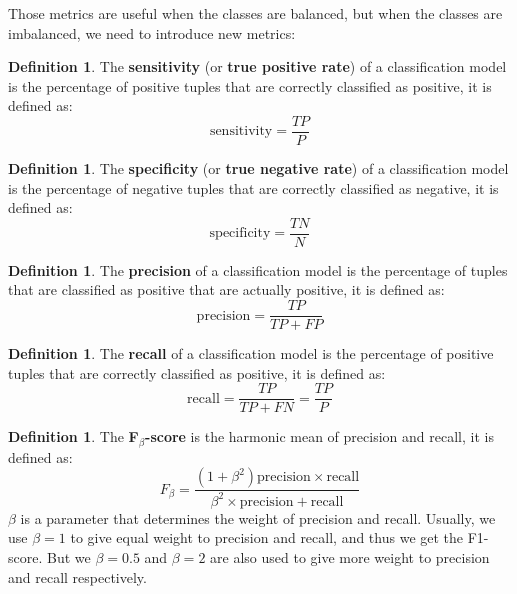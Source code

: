 \documentclass[12pt, openany]{report}
\theoremstyle{definition}
\newtheorem{definition}[thm]{Definition}
\begin{document}
Those metrics are useful when the classes are balanced, but when the classes are imbalanced, we need to introduce new metrics:
\begin{definition}
    The \textbf{sensitivity} (or \textbf{true positive rate}) of a classification model is the percentage of positive tuples that are correctly classified as positive, it is defined as:
    \begin{equation}
        \text{sensitivity} = \frac{TP}{P}
    \end{equation}
\end{definition}
\begin{definition}
    The \textbf{specificity} (or \textbf{true negative rate}) of a classification model is the percentage of negative tuples that are correctly classified as negative, it is defined as:
    \begin{equation}
        \text{specificity} = \frac{TN}{N}
    \end{equation}
\end{definition}
\begin{definition}
    The \textbf{precision} of a classification model is the percentage of tuples that are classified as positive that are actually positive, it is defined as:
    \begin{equation}        
        \text{precision} = \frac{TP}{TP + FP}
    \end{equation}
\end{definition}
\begin{definition}
    The \textbf{recall} of a classification model is the percentage of positive tuples that are correctly classified as positive, it is defined as:
    \begin{equation}
        \text{recall} = \frac{TP}{TP + FN} = \frac{TP}{P}
    \end{equation}
\end{definition}
\begin{definition}
    The \textbf{F$_{\beta}$-score} is the harmonic mean of precision and recall, it is defined as:
    \begin{equation}
    F_{\beta} =  \frac{(1 + \beta^2) \text{precision} \times \text{recall}}{\beta^2 \times \text{precision} + \text{recall}}
    \end{equation}
    $\beta$ is a parameter that determines the weight of precision and recall. Usually, we use $\beta = 1$ to give equal weight to precision and recall, and thus we get the F1-score. But we $\beta = 0.5$ and $\beta = 2$ are also used to give more weight to precision and recall respectively.
\end{definition}
\end{document}
